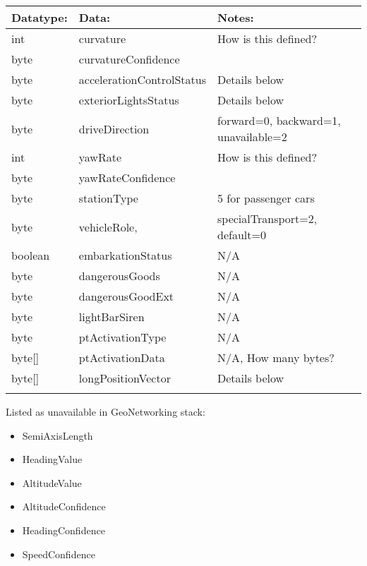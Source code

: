 \documentclass[11pt]{article}
\begin{document}
\begin{center}
\begin{tabular}{lll}
\hline
Datatype: & Data: & Notes:\\
\hline
int & curvature & How is this defined?\\
byte & curvatureConfidence & \\
byte & accelerationControlStatus & Details below\\
byte & exteriorLightsStatus & Details below\\
byte & driveDirection & forward=0, backward=1, unavailable=2\\
int & yawRate & How is this defined?\\
byte & yawRateConfidence & \\
byte & stationType & 5 for passenger cars\\
byte & vehicleRole, & specialTransport=2, default=0\\
boolean & embarkationStatus & N/A\\
byte & dangerousGoods & N/A\\
byte & dangerousGoodExt & N/A\\
byte & lightBarSiren & N/A\\
byte & ptActivationType & N/A\\
byte[] & ptActivationData & N/A, How many bytes?\\
byte[] & longPositionVector & Details below\\
 &  & \\
\end{tabular}
\end{center}

Listed as unavailable in GeoNetworking stack:
\begin{itemize}
\item SemiAxisLength
\item HeadingValue
\item AltitudeValue
\item AltitudeConfidence
\item HeadingConfidence
\item SpeedConfidence
\end{itemize}
\end{document}
